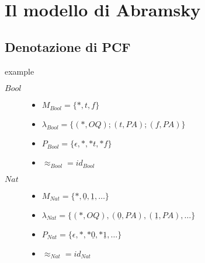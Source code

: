 \documentclass{beamer}
\begin{document}
\section{Il modello di Abramsky}

\subsection{Denotazione di PCF}

\begin{frame}
	
		
	\begin{block}{example}
		\begin{description}
			\item[$Bool$] \begin{itemize}
			              	\item $M_{Bool}=\{*,t,f\}$
			              	\item $\lambda_{Bool}= \{ (*,OQ) ; (t,PA) ; (f,PA) \}$
			              	\item $P_{Bool}= \{ \epsilon , * ,*t, *f \}$
			              	\item $\approx_{Bool} = id_{Bool}$
			              \end{itemize}

			\item[$Nat$] \begin{itemize}
			              	\item $M_{Nat}=\{ * , \underline{0} , \underline{1} , \dots \}$
			              	\item $\lambda_{Nat}= \{ (*,OQ) , (\underline{0},PA) , (\underline{1},PA) , \dots \}$
			              	\item $P_{Nat}= \{ \epsilon , * , *\underline{0} , *\underline{1} , \dots \}$
											\item $\approx_{Nat} = id_{Nat}$
			              \end{itemize}
		\end{description}

	\end{block}	
	
\end{frame}
\end{document}
